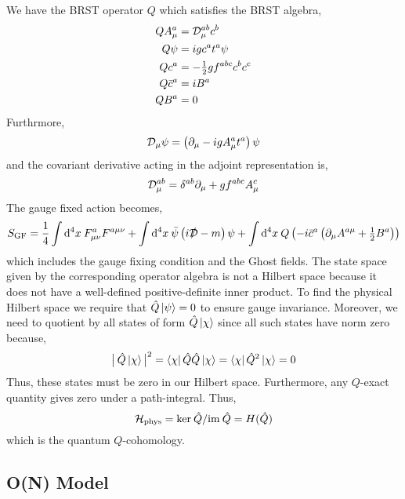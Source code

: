 \documentclass[12pt]{extarticle}
\begin{document}
We have the BRST operator $Q$ which satisfies the BRST algebra,
\begin{align*}
Q A_\mu^a &= \mathcal{D}^{ab}_\mu c^b 
\\
Q \psi & = i g c^a t^a \psi
\\
Q c^a & = -\tfrac{1}{2} g f^{abc} c^b c^c
\\
Q \bar{c}^a & = i B^{a}
\\
Q B^a & = 0
\end{align*}
Furthrmore,
\[ \mathcal{D}_\mu \psi = \left( \partial_\mu - i g A_\mu^a t^a \right) \psi \]
and the covariant derivative acting in the adjoint representation is,
\[ \mathcal{D}^{ab}_\mu = \delta^{ab} \partial_\mu + g f^{abc} A^c_\mu \]
The gauge fixed action becomes,
\[ S_{\text{GF}} = \frac{1}{4} \int \mathrm{d}^{4} x \: F^a_{\mu \nu} F^{a \mu \nu} + \int \mathrm{d}^{4} x \: \bar{\psi} \left( i \slashed{\mathcal{D}} - m \right) \psi + \int \mathrm{d}^{4} x \: Q \left( - i \bar{c}^a \left( \partial_\mu A^{a \mu} + \tfrac{1}{2} B^a \right) \right) \]
which includes the gauge fixing condition and the Ghost fields. The state space given by the corresponding operator algebra is not a Hilbert space because it does not have a well-defined positive-definite inner product. To find the physical Hilbert space we require that $\hat{Q} \left| \psi \right> = 0$ to ensure gauge invariance. Moreover, we need to quotient by all states of form $\hat{Q} \left| \chi \right>$ since all such states have norm zero because,
\[ \big|\: \hat{Q} \left| \chi \right> \big|^2 = \left< \chi \right| \hat{Q} \hat{Q} \left| \chi \right> = \left< \chi \right| \hat{Q}^2 \left| \chi \right> = 0 \]
Thus, these states must be zero in our Hilbert space. Furthermore, any $Q$-exact quantity gives zero under a path-integral. Thus,
\[ \mathcal{H}_{\text{phys}} = \mathrm{ker} \: \hat{Q} / \mathrm{im} \: \hat{Q} = H(\hat{Q}) \]
which is the quantum $Q$-cohomology. 
\subsection{O(N) Model}
\end{document}
